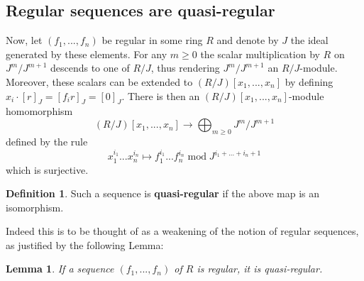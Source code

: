 \documentclass[12pt]{article}
\theoremstyle{plain}
\newtheorem{lemma}[thm]{Lemma}
\theoremstyle{definition}
\newtheorem{defn}[thm]{Definition} %
\begin{document}
\subsection{Regular sequences are quasi-regular}
Now, let $(f_1,...,f_n)$ be regular in some ring $R$ and denote by $J$ the ideal generated by these elements. For any $m \geq 0$ the scalar multiplication by $R$ on $J^m/J^{m+1}$ descends to one of $R/J$, thus rendering $J^m/J^{m+1}$ an $R/J$-module. Moreover, these scalars can be extended to $(R/J)[x_1,...,x_n]$ by defining $x_i\cdot [r]_J = [f_i r]_J = [0]_J$. There is then an $(R/J)[x_1,...,x_n]$-module homomorphism
\begin{equation}
    \label{quasi}
    (R/J)[x_1,...,x_n] \to \bigoplus_{m \geq 0}J^m/J^{m+1}
\end{equation}
defined by the rule
\[x_1^{i_1}...x_n^{i_n} \mapsto f_1^{i_1}...f_n^{i_n}\operatorname{mod}J^{i_1 + ... + i_n + 1}\]
which is surjective.
\begin{defn}
Such a sequence is \textbf{quasi-regular} if the above map is an isomorphism.
\end{defn}
Indeed this is to be thought of as a weakening of the notion of regular sequences, as justified by the following Lemma:
\begin{lemma}
If a sequence $(f_1,...,f_n)$ of $R$ is regular, it is quasi-regular.
\end{lemma}
\end{document}
